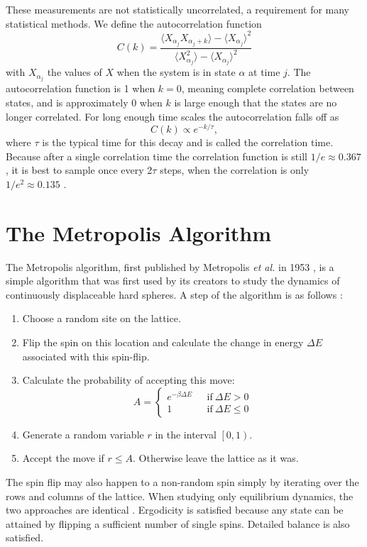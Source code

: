 \documentclass[11pt, a4paper]{report} %
\begin{document}
These measurements are not statistically uncorrelated, a requirement for many statistical methods.
We define the autocorrelation function \cite{binney:1992}
\begin{equation}
	C(k) = \frac{\langle X_{\alpha_j} X_{\alpha_j+k} \rangle - \langle X_{\alpha_j} \rangle^2}{\langle X_{\alpha_j}^2 \rangle - \langle X_{\alpha_j} \rangle^2}
\end{equation}
with \(X_{\alpha_j}\) the values of \(X\) when the system is in state \(\alpha\) at time \(j\).
The autocorrelation function is 1 when \(k=0\), meaning complete correlation between states, and is approximately 0 when \(k\) is large enough that the states are no longer correlated.
For long enough time scales the autocorrelation falls off as
\begin{equation}
	C(k) \propto e^{-k/\tau},
\end{equation}
where \(\tau\) is the typical time for this decay and is called the correlation time.
Because after a single correlation time the correlation function is still \(1/e\approx0.367\), it is best to sample once every 2\(\tau\) steps, when the correlation is only \(1/e^2\approx 0.135\) \cite{newman:1999}.


\section{The Metropolis Algorithm}
The Metropolis algorithm, first published by Metropolis \textit{et al.} in 1953 \cite{metropolis:1953}, is a simple algorithm that was first used by its creators to study the dynamics of continuously displaceable hard spheres.
A step of the algorithm is as follows \cite{binney:1992}:
\begin{enumerate}
	\item Choose a random site on the lattice.
	\item Flip the spin on this location and calculate the change in energy \(\Delta E\) associated with this spin-flip.
	\item Calculate the probability of accepting this move:
	\begin{equation}
		A =
		\begin{cases}
			e^{-\beta \Delta E}\ \ \ &\mathrm{if}\ \Delta E > 0 \\
			1 \ \ \ &\mathrm{if}\ \Delta E \leq 0
		\end{cases}
	\end{equation}
	\item Generate a random variable \(r\) in the interval \(\left[0, 1\right)\).
	\item Accept the move if \(r \leq A\). Otherwise leave the lattice as it was.
\end{enumerate}
The spin flip may also happen to a non-random spin simply by iterating over the rows and columns of the lattice. When studying only equilibrium dynamics, the two approaches are identical \cite{landau:2015}.
Ergodicity is satisfied because any state can be attained by flipping a sufficient number of single spins. Detailed balance is also satisfied.
\end{document}

